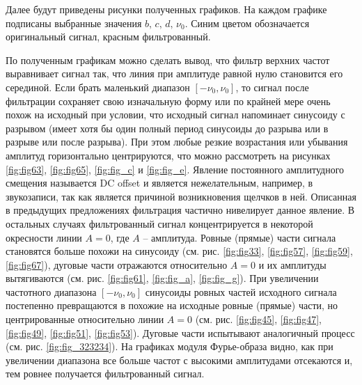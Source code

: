 \documentclass[a4paper, 12pt]{article}
\begin{document}
    Далее будут приведены рисунки полученных графиков. На каждом графике подписаны выбранные значения $b,\,c,\,d,\,\nu_0$. 
    Синим цветом обозначается оригинальный сигнал, красным фильтрованный.


    По полученным графикам можно сделать вывод, что фильтр верхних частот выравнивает сигнал так, что линия при амплитуде равной
    нулю становится его серединой. Если брать маленький диапазон $[-\nu_0,\nu_0]$, то сигнал после фильтрации сохраняет свою
    изначальную форму или по крайней мере очень похож на исходный при условии, что исходный сигнал напоминает синусоиду с разрывом
    (имеет хотя бы один полный период синусоиды до разрыва или в разрыве или после разрыва). При этом любые резкие возрастания или
    убывания амплитуд горизонтально центрируются, что можно рассмотреть на рисунках \ref{fig:fig63}, \ref{fig:fig65}, \ref{fig:fig_c} и \ref{fig:fig_e}.
    Явление постоянного амплитудного смещения называется DC offset и является нежелательным, например, в звукозаписи, так как является
    причиной возникновения щелчков в ней. Описанная в предыдущих предложениях фильтрация частично нивелирует данное явление. В остальных
    случаях фильтрованный сигнал концентрируется в некоторой окресности линии $A=0$, где $A$ -- амплитуда. Ровные (прямые) части сигнала становятся
    больше похожи на синусоиду (см. рис. \ref{fig:fig33}, \ref{fig:fig57}, \ref{fig:fig59}, \ref{fig:fig67}), дуговые части отражаются относительно
    $A=0$ и их амплитуды вытягиваются (см. рис. \ref{fig:fig61}, \ref{fig:fig_a}, \ref{fig:fig_g}). При увеличении частотного диапазона $[-\nu_0,\nu_0]$
    синусоиды ровных частей исходного сигнала постепенно превращаются в похожие на исходные ровные (прямые) части, но центрированные относительно линии $A=0$
    (см. рис. \ref{fig:fig45}, \ref{fig:fig47}, \ref{fig:fig49}, \ref{fig:fig51}, \ref{fig:fig53}). Дуговые части испытывают аналогичный процесс (см. рис. \ref{fig:fig_323234}).
    На графиках модуля Фурье-образа видно, как при увеличении диапазона все больше частот с высокими амплитудами отсекаются и, тем ровнее получается
    фильтрованный сигнал.
\end{document}
